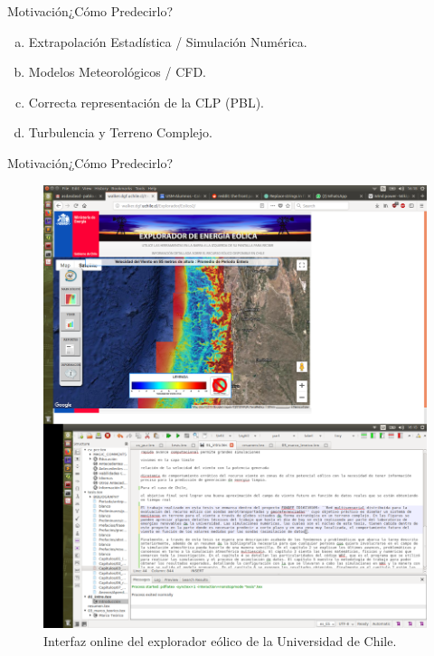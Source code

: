 \documentclass[mathserif]{beamer}
\begin{document}
\begin{frame}{Motivación}{¿Cómo Predecirlo?}
	\begin{enumerate}[a.]
		\item Extrapolación Estadística / Simulación Numérica.
		\item Modelos Meteorológicos / CFD.
		\item Correcta representación de la CLP (PBL).
		\item Turbulencia y Terreno Complejo.
	\end{enumerate}
\end{frame}

\begin{frame}{Motivación}{¿Cómo Predecirlo?}
\begin{figure}[h]
	\centering
	\includegraphics[width=0.8\linewidth,trim={1.4cm 28cm 15cm 3.4cm},clip]{fig/01/explo}
	\vspace{-4mm}
	\caption{Interfaz online del explorador eólico de la Universidad de Chile.}
	\label{fig:01_explorador}
\end{figure}
\end{frame}
\end{document}
